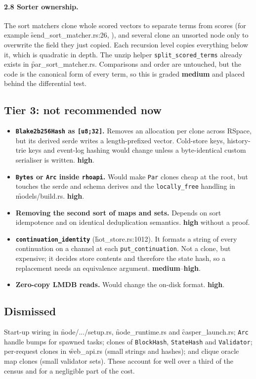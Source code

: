 \documentclass[11pt]{article}
\newcommand{\medium}{\textcolor{med}{\textbf{medium}}}
\newcommand{\high}{\textcolor{hi}{\textbf{high}}}
\begin{document}
\paragraph{2.8 Sorter ownership.} The sort matchers clone whole scored vectors to separate terms
from scores (for example \f{send_sort_matcher.rs}:26,
), and several clone an
unsorted node only to overwrite the field they just copied. Each recursion level copies
everything below it, which is quadratic in depth. The unzip helper \texttt{split\_scored\_terms}
already exists in \f{par_sort_matcher.rs}. Comparisons and order are untouched, but the code is
the canonical form of every term, so this is graded \medium{} and placed behind the
differential test.

\subsection{Tier 3: not recommended now}

\begin{itemize}
\item \textbf{\texttt{Blake2b256Hash} as \texttt{[u8;32]}.} Removes an allocation per clone across
RSpace, but its derived serde writes a length-prefixed vector. Cold-store keys, history-trie keys
and event-log hashing would change unless a byte-identical custom serialiser is written. \high{}.
\item \textbf{\texttt{Bytes} or \texttt{Arc} inside \texttt{rhoapi}.} Would make \texttt{Par}
clones cheap at the root, but touches the serde and schema derives and the
\texttt{locally\_free} handling in \f{models/build.rs}. \high{}.
\item \textbf{Removing the second sort of maps and sets.} Depends on sort idempotence and on
identical deduplication semantics. \high{} without a proof.
\item \textbf{\texttt{continuation\_identity}} (\f{hot_store.rs}:1012). It formats a
 string of every continuation on a channel at each \texttt{put\_continuation}. Not a
clone, but expensive; it decides store contents and therefore the state hash, so a replacement
needs an equivalence argument. \medium{}--\high{}.
\item \textbf{Zero-copy LMDB reads.} Would change the on-disk format. \high{}.
\end{itemize}

\subsection{Dismissed}
Start-up wiring in \f{node/.../setup.rs}, \f{node_runtime.rs} and \f{casper_launch.rs};
\texttt{Arc} handle bumps for spawned tasks; clones of \texttt{BlockHash}, \texttt{StateHash} and
\texttt{Validator}; per-request clones in \f{web_api.rs} (small strings and hashes); and clique
oracle map clones (small validator sets). These account for well over a third of the census and
for a negligible part of the cost.
\end{document}
